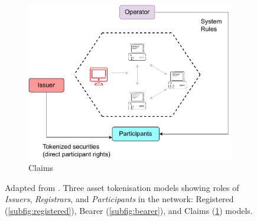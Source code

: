 \begin{figure}
     \\
     \begin{subfigure}[b]{0.7\textwidth}
         \centering
         \begin{minipage}[b][7cm][c]{\linewidth} %
             \centering
             \includegraphics[width=0.8\linewidth]{images/chapter-2/claims_custom.drawio.pdf}
             \caption{Claims}
             \label{subfig:claims}
         \end{minipage}
     \end{subfigure}
    \caption[Asset tokenisation models]{Adapted from \citep{tokenovate_tokenisation_models} \footnotemark. Three asset tokenisation models showing roles of \textit{Issuers}, \textit{Registrars}, and \textit{Participants} in the network: Registered (\ref{subfig:registered}), Bearer (\ref{subfig:bearer}), and Claims (\ref{subfig:claims}) models.}
    
    \label{fig:three graphs}
\end{figure}


